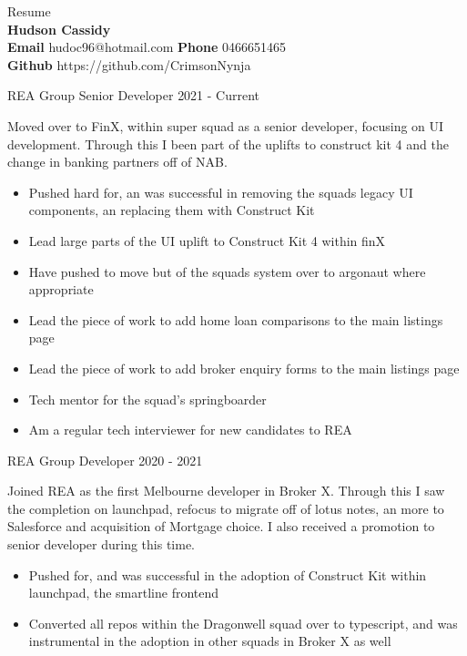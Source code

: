 \documentclass[8pt]{developercv}
\begin{document}
	\begin{minipage}[a]{1.0\textwidth}
		\begin{center}	%
			{\HUGE Resume}\\
			\textbf {Hudson Cassidy} \\
			\textbf {Email} hudoc96@hotmail.com
			\textbf {Phone} 0466651465 \\
			\textbf {Github} https://github.com/CrimsonNynja \\
		\end{center}
	\end{minipage}
	\begin{minipage}[t]{0.7\textwidth}
		\begin{entrylist}	%
			\entry
				{REA Group}
				{Senior Developer}
				{2021 - Current}
				{Moved over to FinX, within super squad as a senior developer, focusing on UI development. Through this I been part of the uplifts to construct kit 4 and the change in banking partners off of NAB.
				\begin{itemize}
					\item Pushed hard for, an was successful in removing the squads legacy UI components, an replacing them with Construct Kit
					\item Lead large parts of the UI uplift to Construct Kit 4 within finX
					\item Have pushed to move but of the squads system over to argonaut where appropriate
					\item Lead the piece of work to add home loan comparisons to the main listings page
					\item Lead the piece of work to add broker enquiry forms to the main listings page
					\item Tech mentor for the squad's springboarder
					\item Am a regular tech interviewer for new candidates to REA
				\end{itemize}								
				}
			\entry
				{REA Group}
				{Developer}
				{2020 - 2021}
				{Joined REA as the first Melbourne developer in Broker X. Through this I saw the completion on launchpad, refocus to migrate off of lotus notes, an more to Salesforce and acquisition of Mortgage choice. I also received a promotion to senior developer during this time.
				\begin{itemize}
					\item Pushed for, and was successful in the adoption of Construct Kit within launchpad, the smartline frontend
					\item Converted all repos within the Dragonwell squad over to typescript, and was instrumental in the adoption in other squads in Broker X as well

\end{itemize}}
\end{entrylist}
\end{minipage}
\end{document}
